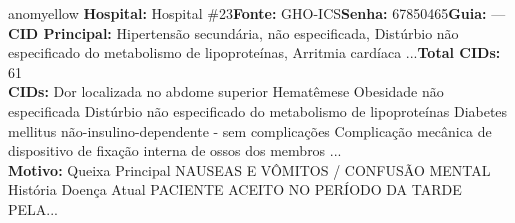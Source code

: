 \documentclass[a4paper,10pt]{article}
\begin{document}
\begin{anomalycard}[Interna\c{c}\~{a}o \#260 | Pac. \#319 | MODERADO (z=2.13) | LOS: 9d | 21/02/2026\,$\to$\,02/03/2026]{anomyellow}
\textbf{Hospital:} Hospital \#23\quad \textbf{Fonte:} GHO-ICS\quad \textbf{Senha:} 67850465\quad \textbf{Guia:} ---\\

\textbf{CID Principal:} {\small Hipertensão secundária, não especificada, Distúrbio não especificado do metabolismo de lipoproteínas, Arritmia cardíaca ...}\quad\textbf{Total CIDs:} 61\\

\textbf{CIDs:} {\scriptsize Dor localizada no abdome superior \textbar{} Hematêmese \textbar{} Obesidade não especificada \textbar{} Distúrbio não especificado do metabolismo de lipoproteínas \textbar{} Diabetes mellitus não-insulino-dependente - sem complicações \textbar{} Complicação mecânica de dispositivo de fixação interna de ossos dos membros \textbar{} ...}\\

\textbf{Motivo:} {\scriptsize Queixa Principal    NAUSEAS E VÔMITOS / CONFUSÃO MENTAL    História Doença Atual    PACIENTE ACEITO NO PERÍODO DA TARDE PELA...}\\

\end{anomalycard}
\end{document}
